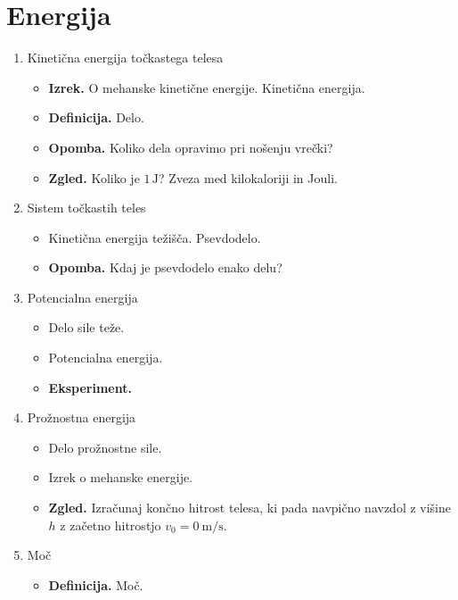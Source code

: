\section{Energija}
\begin{enumerate}
    \item Kinetična energija točkastega telesa
    \begin{itemize}
        \item \textbf{Izrek.} O mehanske kinetične energije. Kinetična energija.
        \item \textbf{Definicija.} Delo.
        \item \textbf{Opomba.} Koliko dela opravimo pri nošenju vrečki?
        \item \textbf{Zgled.} Koliko je \(1\, \text{J}\)? Zveza med kilokaloriji in Jouli.
    \end{itemize}

    \item Sistem točkastih teles
    \begin{itemize}
        \item Kinetična energija težišča. Psevdodelo.
        \item \textbf{Opomba.} Kdaj je psevdodelo enako delu?
    \end{itemize}

    \item Potencialna energija
    \begin{itemize}
        \item Delo sile teže.
        \item Potencialna energija. 
        \item \textbf{Eksperiment.} \todo{}
    \end{itemize}

    \item Prožnostna energija
    \begin{itemize}
        \item Delo prožnostne sile.
        \item Izrek o mehanske energije.
        \item \textbf{Zgled.} Izračunaj končno hitrost telesa, ki pada navpično navzdol z višine \(h\) z začetno hitrostjo \(v_0 = 0 \ \text{m/s}\).
    \end{itemize}

    \item Moč
    \begin{itemize}
        \item \textbf{Definicija.} Moč.
    \end{itemize}
\end{enumerate}
